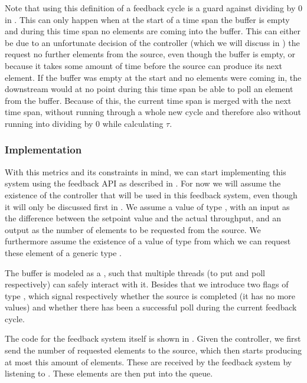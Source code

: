 Note that using this definition of a feedback cycle is a guard against dividing by 0 in . This can only happen when at the start of a time span the buffer is empty and during this time span no elements are coming into the buffer. This can either be due to an unfortunate decision of the controller (which we will discuss in ) the request no further elements from the source, even though the buffer is empty, or because it takes some amount of time before the source can produce its next element. If the buffer was empty at the start and no elements were coming in, the downstream would at no point during this time span be able to poll an element from the buffer. Because of this, the current time span is merged with the next time span, without running through a whole new cycle and therefore also without running into dividing by 0 while calculating $\tau$.

\subsubsection*{Implementation}
With this metrics and its constraints in mind, we can start implementing this system using the feedback API as described in . For now we will assume the existence of the controller that will be used in this feedback system, even though it will only be discussed first in . We assume a value  of type , with an input as the difference between the setpoint value and the actual throughput, and an output as the number of elements to be requested from the source. We furthermore assume the existence of a value  of type  from which we can request these element of a generic type .

The buffer is modeled as a , such that multiple threads (to put and poll respectively) can safely interact with it. Besides that we introduce two flags of type , which signal respectively whether the source is completed (it has no more values) and whether there has been a successful poll during the current feedback cycle.

The code for the feedback system itself is shown in . Given the controller, we first send the number of requested elements to the source, which then starts producing at most this amount of elements. These are received by the feedback system by listening to . These elements are then put into the queue.

